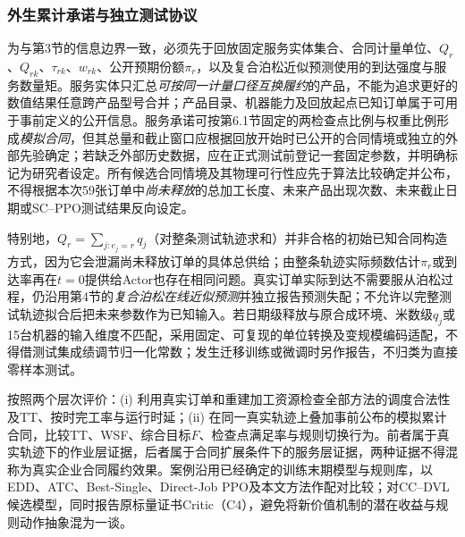\subsubsection{外生累计承诺与独立测试协议}

为与第3节的信息边界一致，必须先于回放固定服务实体集合、合同计量单位、\(Q_r\)、\(Q_{rk}\)、\(\tau_{rk}\)、\(w_{rk}\)、公开预期份额\(\pi_r\)，以及复合泊松近似预测使用的到达强度与服务数量矩。服务实体只汇总\emph{可按同一计量口径互换履约}的产品，不能为追求更好的数值结果任意跨产品型号合并；产品目录、机器能力及回放起点已知订单属于可用于事前定义的公开信息。服务承诺可按第6.1节固定的两检查点比例与权重比例形成\emph{模拟合同}，但其总量和截止窗口应根据回放开始时已公开的合同情境或独立的外部先验确定；若缺乏外部历史数据，应在正式测试前登记一套固定参数，并明确标记为研究者设定。所有候选合同情境及其物理可行性应先于算法比较确定并公布，不得根据本次59张订单中\emph{尚未释放}的总加工长度、未来产品出现次数、未来截止日期或SC--PPO测试结果反向设定。

特别地，\(Q_r=\sum_{j:e_j=r}q_j\)（对整条测试轨迹求和）并非合格的初始已知合同构造方式，因为它会泄漏尚未释放订单的具体总供给；由整条轨迹实际频数估计\(\pi_r\)或到达率再在\(t=0\)提供给Actor也存在相同问题。真实订单实际到达不需要服从泊松过程，仍沿用第4节的\emph{复合泊松在线近似预测}并独立报告预测失配；不允许以完整测试轨迹拟合后把未来参数作为已知输入。若日期级释放与原合成环境、米数级\(q_j\)或15台机器的输入维度不匹配，采用固定、可复现的单位转换及变规模编码适配，不得借测试集成绩调节归一化常数；发生迁移训练或微调时另作报告，不归类为直接零样本测试。

按照两个层次评价：(i) 利用真实订单和重建加工资源检查全部方法的调度合法性及TT、按时完工率与运行时延；(ii) 在同一真实轨迹上叠加事前公布的模拟累计合同，比较TT、WSF、综合目标\(F\)、检查点满足率与规则切换行为。前者属于真实轨迹下的作业层证据，后者属于合同扩展条件下的服务层证据，两种证据不得混称为真实企业合同履约效果。案例沿用已经确定的训练末期模型与规则库，以EDD、ATC、Best-Single、Direct-Job PPO及本文方法作配对比较；对CC--DVL候选模型，同时报告原标量证书Critic（C4），避免将新价值机制的潜在收益与规则动作抽象混为一谈。

